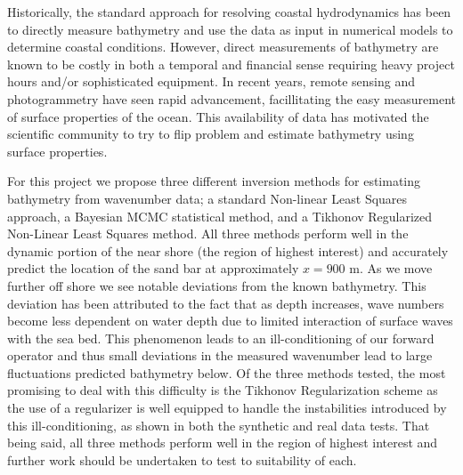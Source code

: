 Historically, the standard approach for resolving coastal hydrodynamics has been to directly measure bathymetry and use the data as input in numerical models to determine coastal conditions. However, direct measurements of bathymetry are known to be costly in both a temporal and financial sense requiring heavy project hours and/or sophisticated equipment. In recent years, remote sensing and photogrammetry have seen rapid advancement, facillitating the easy measurement of surface properties of the ocean. This availability of data has motivated the scientific community to try to flip problem and estimate bathymetry using surface properties.

For this project we propose three different inversion methods for estimating bathymetry from wavenumber data; a standard Non-linear Least Squares approach, a Bayesian MCMC statistical method, and a Tikhonov Regularized Non-Linear Least Squares method. All three methods perform well in the dynamic portion of the near shore (the region of highest interest) and accurately predict the location of the sand bar at approximately $x = 900$ m. As we move further off shore we see notable deviations from the known bathymetry. This deviation has been attributed to the fact that as depth increases, wave numbers become less dependent on water depth due to limited interaction of surface waves with the sea bed. This phenomenon leads to an ill-conditioning of our forward operator and thus small deviations in the measured wavenumber lead to large fluctuations predicted bathymetry below. Of the three methods tested, the most promising to deal with this difficulty is the Tikhonov Regularization scheme as the use of a regularizer is well equipped to handle the instabilities introduced by this ill-conditioning, as shown in both the synthetic and real data tests. That being said, all three methods perform well in the region of highest interest and further work should be undertaken to test to suitability of each.

